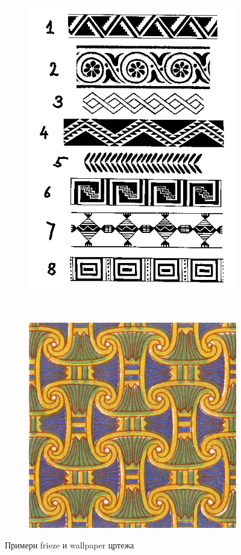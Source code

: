 \documentclass{report}
\theoremstyle{plain}
\theoremstyle{definition}
\begin{document}
\begin{figure}[h]
\centering
\begin{subfigure}{0.4\textwidth}
\includegraphics[height=\textwidth]{frieze}
\end{subfigure}
~
\begin{subfigure}{0.4\textwidth}
\includegraphics[width=\textwidth]{wallpaper}
\end{subfigure}
\caption{Примери frieze и wallpaper цртежа}
\end{figure}
\end{document}
